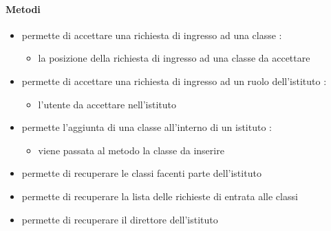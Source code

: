 \paragraph{Metodi}
\begin{itemize}
\item {}
\newline
permette di accettare una richiesta di ingresso ad una classe
\newline
{} :
\begin{itemize}
\item {}
\newline
la posizione della richiesta di ingresso ad una classe da accettare
\end{itemize}
\item {}
\newline
permette di accettare una richiesta di ingresso ad un ruolo dell'istituto
\newline
{} :
\begin{itemize}
\item {}
\newline
l'utente da accettare nell'istituto
\end{itemize}
\item {}
\newline
permette l'aggiunta di una classe all'interno di un istituto
\newline
{} :
\begin{itemize}
\item {}
\newline
viene passata al metodo la classe da inserire
\end{itemize}
\item {}
\newline
permette di recuperare le classi facenti parte dell'istituto
\newline
\item {}
\newline
permette di recuperare la lista delle richieste di entrata alle classi
\newline
\item {}
\newline
permette di recuperare il direttore dell'istituto

\end{itemize}
